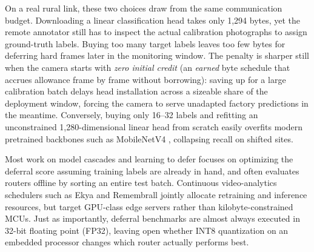 \documentclass[preprint,12pt,authoryear]{elsarticle}
\begin{document}
On a real rural link, these two choices draw from the same communication budget. Downloading a linear classification head takes only 1,294 bytes, yet the remote annotator still has to inspect the actual calibration photographs to assign ground-truth labels. Buying too many target labels leaves too few bytes for deferring hard frames later in the monitoring window. The penalty is sharper still when the camera starts with \emph{zero initial credit} (an \emph{earned} byte schedule that accrues allowance frame by frame without borrowing): saving up for a large calibration batch delays head installation across a sizeable share of the deployment window, forcing the camera to serve unadapted factory predictions in the meantime. Conversely, buying only 16--32 labels and refitting an unconstrained 1,280-dimensional linear head from scratch easily overfits modern pretrained backbones such as MobileNetV4 \citep{mobilenetv4}, collapsing recall on shifted sites.

Most work on model cascades and learning to defer \citep{ova,compareconf,jitkrittum2023,edgeboost,mao2025,gatekeeper} focuses on optimizing the deferral score assuming training labels are already in hand, and often evaluates routers offline by sorting an entire test batch. Continuous video-analytics schedulers such as Ekya \citep{ekya} and Remembrall \citep{remembrall} jointly allocate retraining and inference resources, but target GPU-class edge servers rather than kilobyte-constrained MCUs. Just as importantly, deferral benchmarks are almost always executed in 32-bit floating point (FP32), leaving open whether INT8 quantization on an embedded processor changes which router actually performs best.
\end{document}
